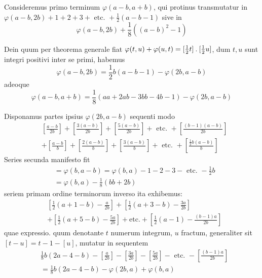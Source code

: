Consideremus primo terminum $\varphi(a-b,a+b)$, qui protinus transmutatur in $\varphi(a-b,2b)+1+2+3+\text{ etc. }+\frac12(a-b-1)$ sive in
\[
\varphi(a-b,2b)+\frac18((a-b)^2-1)
\]

Dein quum per theorema generale fiat $\varphi(t,u)+\varphi(u,t)=[\frac12t]\mathbin{.}[\frac12u]$, dum $t,u$ sunt integri positivi inter se primi, habemus
\[
\varphi(a-b,2b)=\frac12b(a-b-1)-\varphi(2b,a-b)
\]
adeoque
\[
\varphi(a-b,a+b)=\frac18(aa+2ab-3bb-4b-1)-\varphi(2b,a-b)
\]

Disponamus partes ipsius $\varphi(2b,a-b)$ sequenti modo
\[
\begin{aligned}
&\left[\frac{a-b}{2b}\right]+\left[\frac{3(a-b)}{2b}\right]+\left[\frac{5(a-b)}{2b}\right]+\text{ etc. }+\left[\frac{(b-1)(a-b)}{2b}\right]\\
&+\left[\frac{a-b}{b}\right]+\left[\frac{2(a-b)}{b}\right]+\left[\frac{3(a-b)}{b}\right]+\text{ etc. }+\left[\frac{\frac12b(a-b)}{b}\right]
\end{aligned}
\]
Series secunda manifesto fit
\[
\begin{aligned}
&=\varphi(b,a-b)=\varphi(b,a)-1-2-3-\text{ etc. }-\frac12b\\
&=\varphi(b,a)-\frac18(bb+2b)
\end{aligned}
\]
seriem primam ordine terminorum inverso ita exhibemus:
\[
\begin{aligned}
&\left[\frac12(a+1-b)-\frac{a}{2b}\right]+\left[\frac12(a+3-b)-\frac{3a}{2b}\right]\\
&+\left[\frac12(a+5-b)-\frac{5a}{2b}\right]+\text{etc.}+\left[\frac12(a-1)-\frac{(b-1)a}{2b}\right]
\end{aligned}
\]
quae expressio. quum denotante $t$ numerum integrum, $u$ fractum, generaliter sit $[t-u]=t-1-[u]$, mutatur in sequentem
\[
\begin{aligned}
&\frac18b(2a-4-b)-\left[\frac{a}{2b}\right]-\left[\frac{3a}{2b}\right]-\left[\frac{5a}{2b}\right]-\text{ etc. }-\left[\frac{(b-1)a}{2b}\right]\\
&=\frac18b(2a-4-b)-\varphi(2b,a)+\varphi(b,a)
\end{aligned}
\]

